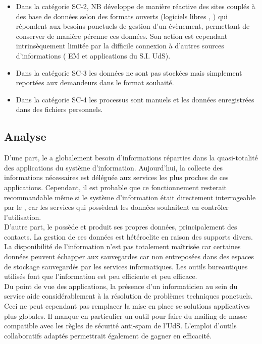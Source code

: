 \documentclass{book}
\begin{document}
\begin{itemize}
\item Dans la catégorie SC-2, NB développe de manière réactive des sites couplés
  à  des   base  de  données   selon  des  formats  ouverts   (logiciels  libres
  , )  qui répondent aux besoins  ponctuels de gestion
  d'un évènement,  permettant de conserver  de manière pérenne ces  données. Son
  action  est cependant  intrinsèquement limitée  par la  difficile connexion  à
  d'autres  sources  d'informations  ( EM  et  applications  du
  S.I. UdS).

\item Dans la catégorie SC-3 les données ne sont pas stockées mais simplement 
	reportées aux demandeurs dans le format souhaité.

\item Dans la catégorie SC-4 les processus sont manuels et les données 
	enregistrées dans des fichiers personnels.
\end{itemize}



\subsection{Analyse}

D'une  part, le  \scom a  globalement  besoin d'informations  réparties dans  la
quasi-totalité  des  applications  du  système  d'information.  Aujourd'hui,  la
collecte des informations nécessaires est déléguée aux services les plus proches
de ces applications. Cependant, il  est probable que ce fonctionnement resterait
recommandable même  si le système d'information  était directement interrogeable
par le \scom, car les services qui possèdent les données souhaitent en contrôler
l'utilisation.\\

D'autre part,  le \scom possède  et produit ses propres  données, principalement
des contacts. La  gestion de ces données est hétéroclite  en raison des supports
divers. La  disponibilité de  l'information n'est  pas totalement  maîtrisée car
certaines données peuvent échapper aux  sauvegardes car non entreposées dans des
espaces  de stockage  sauvegardés  par les  services  informatiques. Les  outils
bureautiques  utilisés  font  que  l'information   est  peu  efficiente  et  peu
efficace.\\


Du point  de vue  des applications,  la présence d'un  informaticien au  sein du
service aide considérablement à la résolution de problèmes techniques ponctuels.
Ceci ne peut cependant pas remplacer  la mise en place se solutions applicatives
plus globales. Il manque en particulier un  outil pour faire du mailing de masse
compatible avec  les règles  de sécurité anti-spam  de l'UdS.  L'emploi d'outils
collaboratifs adaptés permettrait également de gagner en efficacité.
\end{document}
